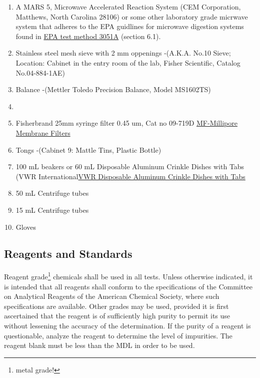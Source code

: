 \documentclass[12pt]{../SOP3_beta}\usepackage[]{graphicx}\usepackage[]{color}
\begin{document}
\begin{enumerate}
  \item A MARS 5, Microwave Accelerated Reaction System (CEM Corporation, Matthews, North Carolina 28106) or some other laboratory grade micrwave system that adheres to the EPA guidlines for microwave digestion systems found in \href{https://www.google.com/url?sa=t&rct=j&q=&esrc=s&source=web&cd=1&cad=rja&uact=8&ved=0ahUKEwjNmefY3tfWAhVP92MKHatgCaQQFggqMAA&url=https%3A%2F%2Fwww.epa.gov%2Fsites%2Fproduction%2Ffiles%2F2015-12%2Fdocuments%2F3051a.pdf&usg=AOvVaw1LPlngQyM_L4Zu4SC-sATE}{EPA test method 3051A} (section 6.1). 
  \item Stainless steel mesh sieve with 2 mm oppenings -(A.K.A. No.10 Sieve; Location: Cabinet in the entry room of the lab, Fisher Scientific, Catalog No.04-884-1AE) 
  \item Balance -(Mettler Toledo Precision Balance, Model MS1602TS)
  \item 
  \item Fisherbrand 25mm syringe filter 0.45 um, Cat no 09-719D \href{https://www.emdmillipore.com/US/en/product/MF-Millipore%E2%84%A2-Membrane-Filters,MM_NF-C152}{MF-Millipore Membrane Filters}
  \item Tongs -(Cabinet 9: Mattle Tins, Plastic Bottle)
  
  \item 100 mL beakers or 60 mL Disposable Aluminum Crinkle Dishes with Tabs (VWR International\href{https://us.vwr.com/store/catalog/product.jsp?product_id=4622693}{VWR Disposable Aluminum Crinkle Dishes with Tabs}
  \item 50 mL Centrifuge tubes
  \item 15 mL Centrifuge tubes
  \item Gloves
\end{enumerate}

\subsection{Reagents and Standards}

\NP Reagent grade\footnote{metal grade!} chemicals shall be used in all tests. Unless otherwise indicated, it is
intended that all reagents shall conform to the specifications of the Committee on Analytical Reagents of the American Chemical Society, where such specifications are available. Other grades may be used, provided it is first ascertained that the reagent is of sufficiently high purity to permit its use without lessening the accuracy of the determination. If the purity of a reagent is questionable, analyze the reagent to determine the level of impurities. The reagent blank must be less than the MDL in order to be used. 
\end{document}
